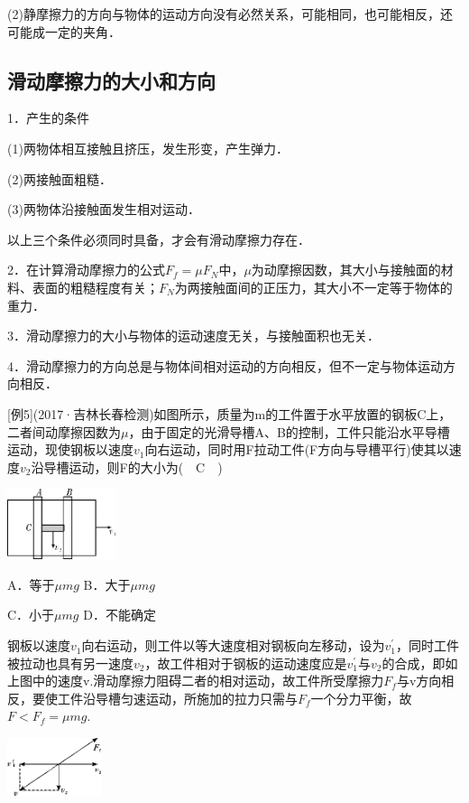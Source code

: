 (2)静摩擦力的方向与物体的运动方向没有必然关系，可能相同，也可能相反，还可能成一定的夹角．
\newpage
\subsection{滑动摩擦力的大小和方向}

1．产生的条件

(1)两物体相互接触且挤压，发生形变，产生弹力．

(2)两接触面粗糙．

(3)两物体沿接触面发生相对运动．

以上三个条件必须同时具备，才会有滑动摩擦力存在．

2．在计算滑动摩擦力的公式$F_f=\mu F_N$中，$\mu$为动摩擦因数，其大小与接触面的材料、表面的粗糙程度有关；$F_N$为两接触面间的正压力，其大小不一定等于物体的重力．

3．滑动摩擦力的大小与物体的运动速度无关，与接触面积也无关．

4．滑动摩擦力的方向总是与物体间相对运动的方向相反，但不一定与物体运动方向相反．

{[}例5{]}(2017·吉林长春检测)如图所示，质量为m的工件置于水平放置的钢板C上，二者间动摩擦因数为$\mu$，由于固定的光滑导槽A、B的控制，工件只能沿水平导槽运动，现使钢板以速度$v_1$向右运动，同时用F拉动工件(F方向与导槽平行)使其以速度$v_2$沿导槽运动，则F的大小为(　C　)

\begin{center}\includegraphics[width=1.25in,height=0.8125in]{media/image50.png}\end{center}

A．等于$\mu mg$ B．大于$\mu mg$

C．小于$\mu mg$ D．不能确定
\begin{solution}
	钢板以速度$v_1$向右运动，则工件以等大速度相对钢板向左移动，设为$v_1^{\prime}$，同时工件被拉动也具有另一速度$v_2$，故工件相对于钢板的运动速度应是$v_1^{\prime}$与$v_2$的合成，即如上图中的速度v.滑动摩擦力阻碍二者的相对运动，故工件所受摩擦力$F_f$与v方向相反，要使工件沿导槽匀速运动，所施加的拉力只需与$F_f$一个分力平衡，故 $F< F_f=\mu mg$.
\end{solution}

\begin{center}\includegraphics[width=1.08333in,height=0.66667in]{media/image51.png}\end{center}
\newpage
